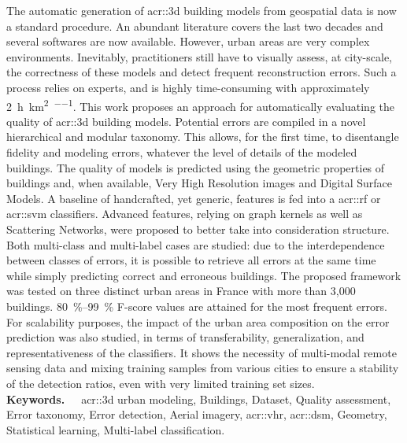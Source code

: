 The automatic generation of \acrshort*{acr::3d} building models from geospatial data is now a standard procedure.
An abundant literature covers the last two decades and several softwares are now available.
However, urban areas are very complex environments.
Inevitably, practitioners still have to visually assess, at city-scale, the correctness of these models and detect frequent reconstruction errors.
Such a process relies on experts, and is highly time-consuming with approximately \SI[per-mode=repeated-symbol]{2}{\hour\per\km\squared\per\expert}.
This work proposes an approach for automatically evaluating the quality of \acrshort*{acr::3d} building models.
Potential errors are compiled in a novel hierarchical and modular taxonomy.
This allows, for the first time, to disentangle fidelity and modeling errors, whatever the level of details of the modeled buildings.
The quality of models is predicted using the geometric properties of buildings and, when available, Very High Resolution images and Digital Surface Models.
A baseline of handcrafted, yet generic, features is fed into a \acrlong*{acr::rf} or \acrlong*{acr::svm} classifiers.
Advanced features, relying on graph kernels as well as Scattering Networks, were proposed to better take into consideration structure.
Both multi-class and multi-label cases are studied: due to the interdependence between classes of errors, it is possible to retrieve all errors at the same time while simply predicting correct and erroneous buildings.
The proposed framework was tested on three distinct urban areas in France with more than 3,000 buildings.
\SIrange{80}{99}{\percent} F-score values are attained for the most frequent errors.
For scalability purposes, the impact of the urban area composition on the error prediction was also studied, in terms of transferability, generalization, and representativeness of the classifiers.
It shows the necessity of multi-modal remote sensing data and mixing training samples from various cities to ensure a stability of the detection ratios, even with very limited training set sizes.\\

\textbf{Keywords.}~\ ~\Acrshort*{acr::3d} urban modeling, Buildings, Dataset, Quality assessment, Error taxonomy, Error detection, Aerial imagery, \acrlong*{acr::vhr}, \acrlong*{acr::dsm}, Geometry, Statistical learning, Multi-label classification.\\
